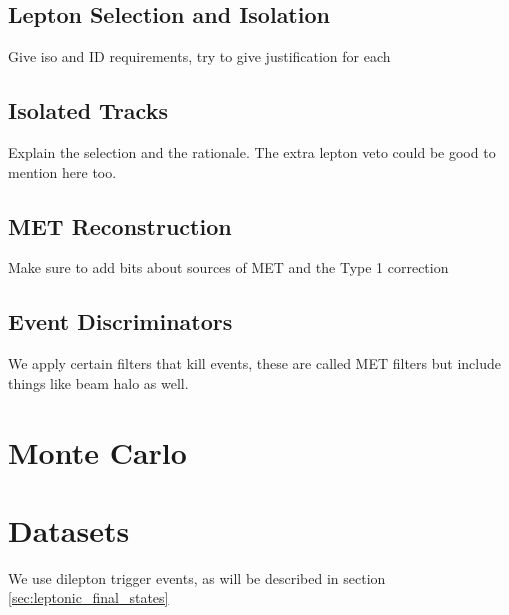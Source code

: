 \subsection{Lepton Selection and Isolation}
Give iso and ID requirements, try to give justification for each
\subsection{Isolated Tracks}
Explain the selection and the rationale. The extra lepton veto could be good to mention here too. 
\subsection{MET Reconstruction} \label{sec:MET_reco}
  Make sure to add bits about sources of MET and the Type 1 correction
\subsection{Event Discriminators}
  We apply certain filters that kill events, these are called MET filters but include things like beam halo as well.

\section{Monte Carlo}

\section{Datasets} \label{sec:datasets}
We use dilepton trigger events, as will be described in section \ref{sec:leptonic_final_states}